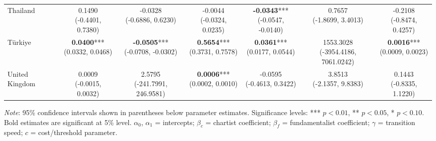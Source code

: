 \documentclass[a4paper,10pt,final]{article}    %
\begin{document}
\begin{table}[htbp]
{\begin{tabular}{l|cccccc}
            Thailand       & \makecell{0.1490                                                                               \\ \scriptsize{(-0.4401, 0.7380)}} & \makecell{-0.0328 \\ \scriptsize{(-0.6886, 0.6230)}} & \makecell{-0.0044 \\ \scriptsize{(-0.0324, 0.0235)}} & \makecell{\textbf{-0.0343}*** \\ \scriptsize{(-0.0547, -0.0140)}} & \makecell{0.7657 \\ \scriptsize{(-1.8699, 3.4013)}} & \makecell{-0.2108 \\ \scriptsize{(-0.8474, 0.4257)}} \\
            Türkiye        & \makecell{\textbf{0.0400}***                                                                   \\ \scriptsize{(0.0332, 0.0468)}} & \makecell{\textbf{-0.0505}*** \\ \scriptsize{(-0.0708, -0.0302)}} & \makecell{\textbf{0.5654}*** \\ \scriptsize{(0.3731, 0.7578)}} & \makecell{\textbf{0.0361}*** \\ \scriptsize{(0.0177, 0.0544)}} & \makecell{1553.3028 \\ \scriptsize{(-3954.4186, 7061.0242)}} & \makecell{\textbf{0.0016}*** \\ \scriptsize{(0.0009, 0.0023)}} \\
            United Kingdom & \makecell{0.0009                                                                               \\ \scriptsize{(-0.0015, 0.0032)}} & \makecell{2.5795 \\ \scriptsize{(-241.7991, 246.9581)}} & \makecell{\textbf{0.0006}*** \\ \scriptsize{(0.0002, 0.0010)}} & \makecell{-0.0595 \\ \scriptsize{(-0.4613, 0.3422)}} & \makecell{3.8513 \\ \scriptsize{(-2.1357, 9.8383)}} & \makecell{0.1443 \\ \scriptsize{(-0.8335, 1.1220)}} \\
            \bottomrule
        \end{tabular}%
    }
    \begin{tablenotes}
        \small
        \textit{Note}: 95\% confidence intervals shown in parentheses below parameter estimates.
        Significance levels: *** $p<0.01$, ** $p<0.05$, * $p<0.10$.
        Bold estimates are significant at 5\% level.
        $\alpha_0$, $\alpha_1$ = intercepts; $\beta_c$ = chartist coefficient;
        $\beta_f$ = fundamentalist coefficient; $\gamma$ = transition speed; $c$ = cost/threshold parameter.
    \end{tablenotes}
\end{table}
\end{document}
